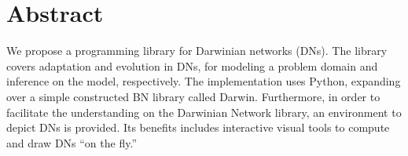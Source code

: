 %
\chapter*{Abstract}
\label{sec:abstract}
\vspace*{-10mm}

We propose a programming library for Darwinian networks (DNs).
The library covers adaptation and evolution in DNs, for modeling a problem domain and inference on the model, respectively.
The implementation uses Python, expanding over a simple constructed BN library called Darwin.
Furthermore, in order to facilitate the understanding on the Darwinian Network library, an environment to depict DNs is provided.
Its benefits includes interactive visual tools to compute and draw DNs ``on the fly.''
